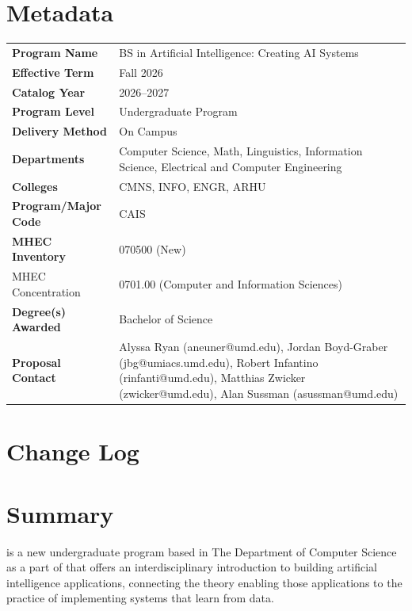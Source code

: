 \documentclass[
10pt, %
a4paper, %
oneside, %
headinclude,footinclude, %
BCOR5mm, %
]{scrartcl}
\begin{document}
\section{Metadata}

\begin{tabular}{lp{8cm}}
\toprule
\textbf{Program Name} & BS in Artificial Intelligence: Creating AI Systems \\
\textbf{Effective Term} & Fall 2026 \\
\textbf{Catalog Year} & 2026--2027 \\
\textbf{Program Level} & Undergraduate Program \\
\textbf{Delivery Method} & On Campus \\
\textbf{Departments} & Computer Science, Math, Linguistics, Information Science, Electrical and Computer Engineering \\
\textbf{Colleges} & CMNS, INFO, ENGR, ARHU \\
\textbf{Program/Major Code} & CAIS \\
\textbf{MHEC Inventory} & 070500 (New) \\
{MHEC Concentration} & 0701.00 (Computer and Information Sciences) \\  %
\textbf{Degree(s) Awarded} & Bachelor of Science \\
\textbf{Proposal Contact} & Alyssa Ryan (aneuner@umd.edu), Jordan Boyd-Graber (jbg@umiacs.umd.edu), Robert Infantino (rinfanti@umd.edu), Matthias Zwicker (zwicker@umd.edu), Alan Sussman (asussman@umd.edu)  \\
\bottomrule
\end{tabular}

\section{Change Log}




\section{Summary}

\name{} is a new undergraduate program based in The Department of Computer Science as a part of \aim{} that offers an interdisciplinary introduction to building artificial intelligence applications, connecting the theory enabling those applications to the practice of implementing systems that learn from data.
\end{document}
